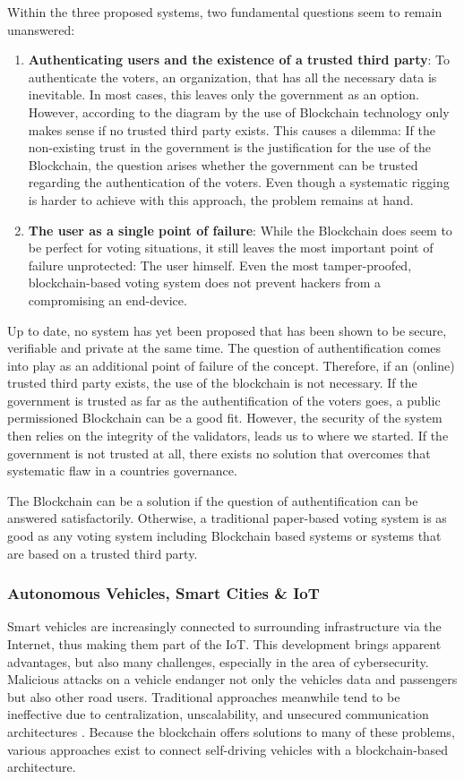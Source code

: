 Within the three proposed systems, two fundamental questions seem to remain unanswered:
\begin{enumerate}
    \item \textbf{Authenticating users and the existence of a trusted third party}: To authenticate the voters, an organization, that has all the necessary data is inevitable. In most cases, this leaves only the government as an option. However, according to the diagram by \citeauthor{Wust2017} the use of Blockchain technology only makes sense if no trusted third party exists. This causes a dilemma: If the non-existing trust in the government is the justification for the use of the Blockchain, the question arises whether the government can be trusted regarding the authentication of the voters. Even though a systematic rigging is harder to achieve with this approach, the problem remains at hand.
    \item \textbf{The user as a single point of failure}: While the Blockchain does seem to be perfect for voting situations, it still leaves the most important point of failure unprotected: The user himself. Even the most tamper-proofed, blockchain-based voting system does not prevent hackers from a compromising an end-device.
\end{enumerate}

Up to date, no system has yet been proposed that has been shown to be secure, verifiable and private at the same time. The question of authentification comes into play as an additional point of failure of the concept. \cite{Osgood2016}
Therefore, if an (online) trusted third party exists, the use of the blockchain is not necessary. If the government is trusted as far as the authentification of the voters goes, a public permissioned Blockchain can be a good fit. However, the security of the system then relies on the integrity of the validators,  leads us to where we started. If the government is not trusted at all, there exists no solution that overcomes that systematic flaw in a countries governance.

The Blockchain can be a solution if the question of authentification can be answered satisfactorily. Otherwise, a traditional paper-based voting system is as good as any voting system including Blockchain based systems or systems that are based on a trusted third party.

\subsubsection{Autonomous Vehicles, Smart Cities \& IoT}
Smart vehicles are increasingly connected to surrounding infrastructure via the Internet, thus making them part of the IoT. This development brings apparent advantages, but also many challenges, especially in the area of cybersecurity. Malicious attacks on a vehicle endanger not only the vehicles data and passengers but also other road users. Traditional approaches meanwhile tend to be ineffective due to centralization, unscalability, and unsecured communication architectures \cite{DorriSteger2017}. Because the blockchain offers solutions to many of these problems, various approaches exist to connect self-driving vehicles with a blockchain-based architecture.

